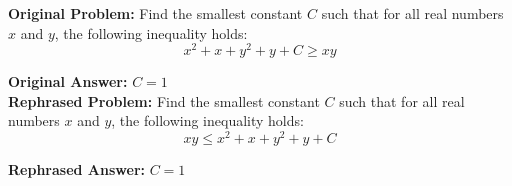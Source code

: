 \begin{examplebox}

\textbf{Original Problem:} Find the smallest constant $C$ such that for all real numbers $x$ and $y$, the following inequality holds:
$$
x^2 + x + y^2 + y + C \geq x y
$$

\textbf{Original Answer:} $\boxed{C=1}$ \\

\textbf{Rephrased Problem:} Find the smallest constant $C$ such that for all real numbers $x$ and $y$, the following inequality holds:
$$
 x y \leq x^2 + x + y^2 + y + C 
$$

\textbf{Rephrased Answer:} $\boxed{C=1}$

\end{examplebox}